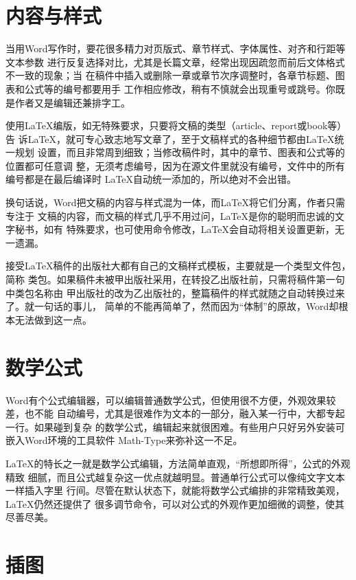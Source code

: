 \section*{内容与样式}

当用Word写作时，要花很多精力对页版式、章节样式、字体属性、对齐和行距等文本参数
进行反复选择对比，尤其是长篇文章，经常出现因疏忽而前后文体格式不一致的现象；当
在稿件中插入或删除一章或章节次序调整时，各章节标题、图表和公式等的编号都要用手
工作相应修改，稍有不慎就会出现重号或跳号。你既是作者又是编辑还兼排字工。

使用\LaTeX{}编版，如无特殊要求，只要将文稿的类型（article、report或book等）告
诉\LaTeX{}，就可专心致志地写文章了，至于文稿样式的各种细节都由\LaTeX{}统一规划
设置，而且非常周到细致；当修改稿件时，其中的章节、图表和公式等的位置都可任意调
整，无须考虑编号，因为在源文件里就没有编号，文件中的所有编号都是在最后编译时
\LaTeX{}自动统一添加的，所以绝对不会出错。

换句话说，Word把文稿的内容与样式混为一体，而\LaTeX{}将它们分离，作者只需专注于
文稿的内容，而文稿的样式几乎不用过问，\LaTeX{}是你的聪明而忠诚的文字秘书，如有
特殊要求，也可使用命令修改，\LaTeX{}会自动将相关设置更新，无一遗漏。

接受\LaTeX{}稿件的出版社大都有自己的文稿样式模板，主要就是一个类型文件包，简称
类包。如果稿件未被甲出版社采用，在转投乙出版社前，只需将稿件第一句中类包名称由
甲出版社的改为乙出版社的，整篇稿件的样式就随之自动转换过来了。就一句话的事儿，
简单的不能再简单了，然而因为“体制”的原故，Word却根本无法做到这一点。

\section*{数学公式}

Word有个公式编辑器，可以编辑普通数学公式，但使用很不方便，外观效果较差，也不能
自动编号，尤其是很难作为文本的一部分，融入某一行中，大都专起一行。如果碰到复杂
的数学公式，编辑起来就很困难。有些用户只好另外安装可嵌入Word环境的工具软件
Math-Type来弥补这一不足。

\LaTeX{}的特长之一就是数学公式编辑，方法简单直观，“所想即所得”，公式的外观精致
细腻，而且公式越复杂这一优点就越明显。普通单行公式可以像纯文字文本一样插入字里
行间。尽管在默认状态下，就能将数学公式编排的非常精致美观，\LaTeX{}仍然还提供了
很多调节命令，可以对公式的外观作更加细微的调整，使其尽善尽美。

\section*{插图}

